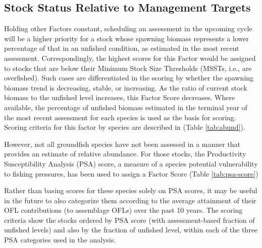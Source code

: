 \documentclass[11pt,
  english,
  a4paper,
]{article}
\begin{document}

\hypertarget{stock-status-relative-to-management-targets}{%
\subsection{Stock Status Relative to Management Targets}\label{stock-status-relative-to-management-targets}}

\leavevmode\tagmcend\tagstructend


Holding other Factors constant, scheduling an assessment in the upcoming cycle will be a higher priority for a stock whose spawning biomass represents a lower percentage of that in an unfished condition, as estimated in the most recent assessment. Correspondingly, the highest scores for this Factor would be assigned to stocks that are below their Minimum Stock Size Thresholds (MSSTs, i.e., are overfished). Such cases are differentiated in the scoring by whether the spawning biomass trend is decreasing, stable, or increasing. As the ratio of current stock biomass to the unfished level increases, this Factor Score decreases. Where available, the percentage of unfished biomass estimated in the terminal year of the most recent assessment for each species is used as the basis for scoring. Scoring criteria for this factor by species are described in (Table \ref{tab:abund}).

\leavevmode\tagmcend\tagstructend\par


However, not all groundfish species have not been assessed in a manner that provides an estimate of relative abundance. For those stocks, the Productivity Susceptibility Analysis (PSA) score, a measure of a species potential vulnerability to fishing pressures, has been used to assign a Factor Score (Table \ref{tab:psa-score})

\leavevmode\tagmcend\tagstructend\par


Rather than basing scores for these species solely on PSA scores, it may be useful in the future to also categorize them according to the average attainment of their OFL contributions (to assemblage OFLs) over the past 10 years. The scoring criteria show the stocks ordered by PSA score (with assessment-based fraction of unfished levels) and also by the fraction of unfished level, within each of the three PSA categories used in the analysis.
\end{document}
